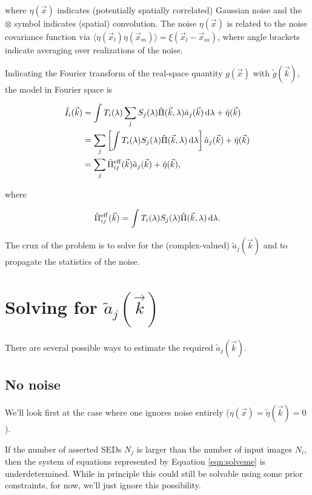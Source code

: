 \documentclass{article}
\begin{document}
where $\eta(\vec{x})$ indicates (potentially spatially correlated) Gaussian noise and the $\otimes$
symbol indicates (spatial) convolution.  The noise $\eta(\vec{x})$ is related to the noise
covariance function via $\langle\eta(\vec{x}_l) \eta(\vec{x}_m)\rangle = \xi(\vec{x}_l -
\vec{x}_m)$, where angle brackets indicate averaging over realizations of the noise.

Indicating the Fourier transform of the real-space quantity $g(\vec{x})$ with $\tilde{g}(\vec{k})$,
the model in Fourier space is

\begin{align}
    \tilde{I}_i(\vec{k})
    &= \int T_i(\lambda) \sum_j S_j(\lambda) \tilde{\Pi}(\vec{k}, \lambda) \tilde{a}_j(\vec{k}) \dif{\lambda} + \tilde{\eta}(\vec{k}) \\
    &= \sum_j \left[\int T_i(\lambda) S_j(\lambda) \tilde{\Pi}(\vec{k}, \lambda) \dif{\lambda}\right] \tilde{a}_j(\vec{k}) + \tilde{\eta}(\vec{k}) \\
    \label{eqn:solveme}
    &=  \sum_j \tilde{\Pi}^\mathrm{eff}_{ij}(\vec{k}) \tilde{a}_j(\vec{k}) + \tilde{\eta}(\vec{k}),
\end{align}

where

\begin{equation}
  \tilde{\Pi}^\mathrm{eff}_{ij}(\vec{k}) = \int T_i(\lambda) S_j(\lambda) \tilde{\Pi}(\vec{k}, \lambda) \dif{\lambda}.
\end{equation}

The crux of the problem is to solve for the (complex-valued) $\tilde{a}_j(\vec{k})$ and to propagate
the statistics of the noise.

\section{Solving for $\tilde{a}_j(\vec{k})$}

There are several possible ways to estimate the required $\tilde{a}_j(\vec{k})$.

\subsection{No noise}

We'll look first at the case where one ignores noise entirely ($\eta(\vec{x}) =
\tilde{\eta}(\vec{k})= 0$).

If the number of asserted SEDs $N_j$ is larger than the number of input images $N_i$, then the
system of equations represented by Equation \ref{eqn:solveme} is underdetermined.  While in
principle this could still be solvable using some prior constraints, for now, we'll just ignore this
possibility.
\end{document}
